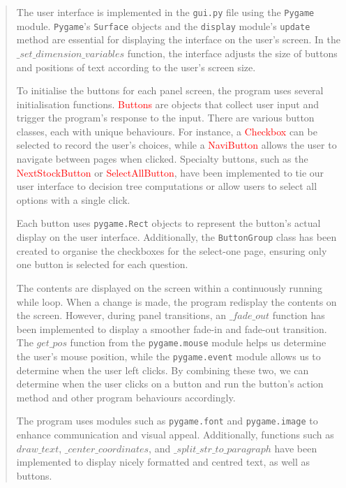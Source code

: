 \documentclass[fontsize=12pt]{article}
\begin{document}
\begin{quote}
\noindent The user interface is implemented in the \texttt{gui.py} file using the \texttt{Pygame} module. \texttt{Pygame}'s \texttt{Surface} objects and the \texttt{display} module's \texttt{update} method are essential for displaying the interface on the user's screen. In the \texttt{$\_set\_dimension\_variables$} function, the interface adjusts the size of buttons and positions of text according to the user's screen size.

To initialise the buttons for each panel screen, the program uses several initialisation functions. \textcolor{red}{Buttons} are objects that collect user input and trigger the program's response to the input. There are various button classes, each with unique behaviours. For instance, a \textcolor{red}{Checkbox} can be selected to record the user's choices, while a \textcolor{red}{NaviButton} allows the user to navigate between pages when clicked. Specialty buttons, such as the \textcolor{red}{NextStockButton} or \textcolor{red}{SelectAllButton}, have been implemented to tie our user interface to decision tree computations or allow users to select all options with a single click.

Each button uses \texttt{pygame.Rect} objects to represent the button's actual display on the user interface. Additionally, the \texttt{ButtonGroup} class has been created to organise the checkboxes for the select-one page, ensuring only one button is selected for each question.

The contents are displayed on the screen within a continuously running while loop. When a change is made, the program redisplay the contents on the screen. However, during panel transitions, an \texttt{$\_fade\_out$} function has been implemented to display a smoother fade-in and fade-out transition. The \texttt{$get\_pos$} function from the \texttt{pygame.mouse} module helps us determine the user's mouse position, while the \texttt{pygame.event} module allows us to determine when the user left clicks. By combining these two, we can determine when the user clicks on a button and run the button's action method and other program behaviours accordingly.

The program uses modules such as \texttt{pygame.font} and \texttt{pygame.image} to enhance communication and visual appeal. Additionally, functions such as \texttt{$draw\_text$}, \texttt{$\_center\_coordinates$}, and \texttt{$\_split\_str\_to\_paragraph$} have been implemented to display nicely formatted and centred text, as well as buttons.


\end{quote}
\end{document}
